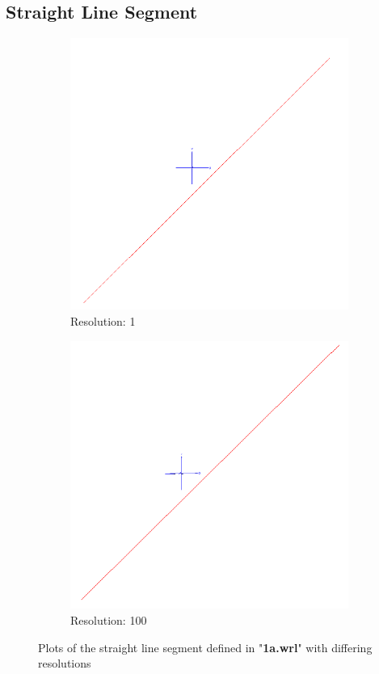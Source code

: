\documentclass[acmlarge,nonacm=true]{acmart}
\begin{document}
\subsection{Straight Line Segment}
\begin{figure}[H]
	\begin{subfigure}{.5\textwidth}
	  \centering
	  \includegraphics[width=.8\linewidth]{fig/1a2}
	  \caption{Resolution: 1}
	\end{subfigure}%
	\begin{subfigure}{.5\textwidth}
	  \centering
	  \includegraphics[width=.8\linewidth]{fig/1a100}
	  \caption{Resolution: 100}
	\end{subfigure}
	\caption{Plots of the straight line segment defined in "\textbf{1a.wrl}" with differing resolutions}
	\label{fig:1a}
\end{figure}
\end{document}
